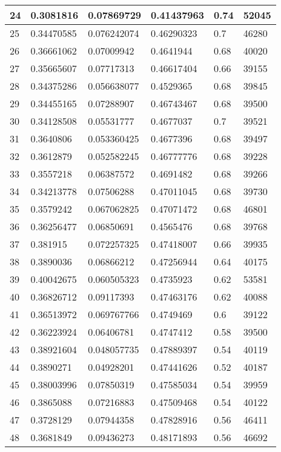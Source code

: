 \begin{longtable}{|l|l|l|l|l|l|}
24 & 0.3081816 & 0.07869729 & 0.41437963 & 0.74 & 52045 \\ \hline 
25 & 0.34470585 & 0.076242074 & 0.46290323 & 0.7 & 46280 \\ \hline 
26 & 0.36661062 & 0.07009942 & 0.4641944 & 0.68 & 40020 \\ \hline 
27 & 0.35665607 & 0.07717313 & 0.46617404 & 0.66 & 39155 \\ \hline 
28 & 0.34375286 & 0.056638077 & 0.4529365 & 0.68 & 39845 \\ \hline 
29 & 0.34455165 & 0.07288907 & 0.46743467 & 0.68 & 39500 \\ \hline 
30 & 0.34128508 & 0.05531777 & 0.4677037 & 0.7 & 39521 \\ \hline 
31 & 0.3640806 & 0.053360425 & 0.4677396 & 0.68 & 39497 \\ \hline 
32 & 0.3612879 & 0.052582245 & 0.46777776 & 0.68 & 39228 \\ \hline 
33 & 0.3557218 & 0.06387572 & 0.4691482 & 0.68 & 39266 \\ \hline 
34 & 0.34213778 & 0.07506288 & 0.47011045 & 0.68 & 39730 \\ \hline 
35 & 0.3579242 & 0.067062825 & 0.47071472 & 0.68 & 46801 \\ \hline 
36 & 0.36256477 & 0.06850691 & 0.4565476 & 0.68 & 39768 \\ \hline 
37 & 0.381915 & 0.072257325 & 0.47418007 & 0.66 & 39935 \\ \hline 
38 & 0.3890036 & 0.06866212 & 0.47256944 & 0.64 & 40175 \\ \hline 
39 & 0.40042675 & 0.060505323 & 0.4735923 & 0.62 & 53581 \\ \hline 
40 & 0.36826712 & 0.09117393 & 0.47463176 & 0.62 & 40088 \\ \hline 
41 & 0.36513972 & 0.069767766 & 0.4749469 & 0.6 & 39122 \\ \hline 
42 & 0.36223924 & 0.06406781 & 0.4747412 & 0.58 & 39500 \\ \hline 
43 & 0.38921604 & 0.048057735 & 0.47889397 & 0.54 & 40119 \\ \hline 
44 & 0.3890271 & 0.04928201 & 0.47441626 & 0.52 & 40187 \\ \hline 
45 & 0.38003996 & 0.07850319 & 0.47585034 & 0.54 & 39959 \\ \hline 
46 & 0.3865088 & 0.07216883 & 0.47509468 & 0.54 & 40122 \\ \hline 
47 & 0.3728129 & 0.07944358 & 0.47828916 & 0.56 & 46411 \\ \hline 
48 & 0.3681849 & 0.09436273 & 0.48171893 & 0.56 & 46692 \\ \hline 

\end{longtable}
